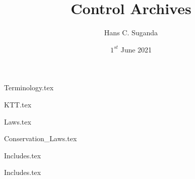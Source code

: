 \documentclass[a4paper, 12pt]{report}
\begin{document}
\title{Control Archives}
\author{Hans C. Suganda}
\date{$1^{st}$ June 2021}
\maketitle
\newpage

\tableofcontents

\begin{center}
{Terminology.tex}
\begin{comment}
Start Level: Chapter
End Level: Chapter
Aditional Comments:
\end{comment}
{KTT.tex}
\begin{comment}
Start Level: Chapter
End Level: Chapter
Aditional Comments:
Kinematic Transport Theorem
\end{comment}
{Laws.tex}
\begin{comment}
Start Level: Chapter
End Level: Chapter
Aditional Comments:
Laws of Motions
\end{comment}
{Conservation_Laws.tex}
\begin{comment}
Start Level: Chapter
End Level: Chapter
Aditional Comments:
Conservation Laws
\end{comment}
{Includes.tex}
\begin{comment}
Start Level: Chapter
End Level: Chapter
Aditional Comments:
Rotational Dynamics
\end{comment}
{Includes.tex}

\end{center}
\end{document}
